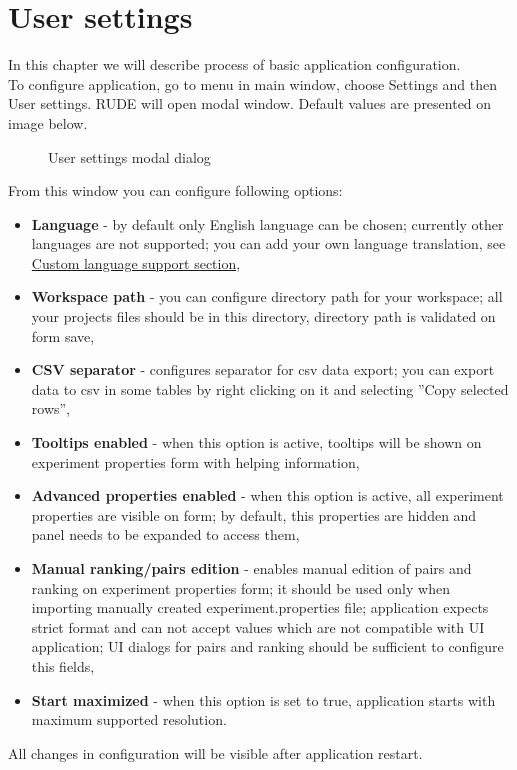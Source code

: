 \section{User settings}\label{section:user-settings}

In this chapter we will describe process of basic application configuration.\\

To configure application, go to menu in main window, choose Settings and then User settings. RUDE will open modal window. Default values are presented on image below.

\begin{figure*}[!ht] 
	\centering
	\caption{User settings modal dialog}
\end{figure*}


From this window you can configure following options:
\begin{itemize}
	\item \textbf{Language} - by default only English language can be chosen; currently other languages are not supported; you can add your own language translation, see \hyperref[sub:config-labels]{Custom language support section},
	\item \textbf{Workspace path} - you can configure directory path for your workspace; all your projects files should be in this directory, directory path is validated on form save,
	\item \textbf{CSV separator} - configures separator for csv data export; you can export data to csv in some tables by right clicking on it and selecting ''Copy selected rows'',
	\item \textbf{Tooltips enabled} - when this option is active, tooltips will be shown on experiment properties form with helping information,
	\item \textbf{Advanced properties enabled} - when this option is active, all experiment properties are visible on form; by default, this properties are hidden and panel needs to be expanded to access them,
	\item \textbf{Manual ranking/pairs edition} - enables manual edition of pairs and ranking on experiment properties form; it should be used only when importing manually created experiment.properties file; application expects strict format and can not accept values which are not compatible with UI application; UI dialogs for pairs and ranking should be sufficient to configure this fields,
	\item \textbf{Start maximized} - when this option is set to true, application starts with maximum supported resolution.
\end{itemize}

All changes in configuration will be visible after application restart.


\vfill\newpage